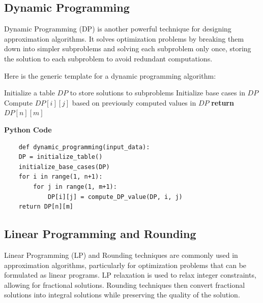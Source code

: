 \documentclass[12pt]{book} %
\begin{document}
\subsection{Dynamic Programming}

Dynamic Programming (DP) is another powerful technique for designing approximation algorithms. It solves optimization problems by breaking them down into simpler subproblems and solving each subproblem only once, storing the solution to each subproblem to avoid redundant computations.

Here is the generic template for a dynamic programming algorithm:
\FloatBarrier
\begin{algorithm}
\caption{Generic Dynamic Programming Algorithm}\label{alg:dp}
\begin{algorithmic}[1]
\State Initialize a table $DP$ to store solutions to subproblems
\State Initialize base cases in $DP$
        \State Compute $DP[i][j]$ based on previously computed values in $DP$
    \EndFor
\EndFor
\State \textbf{return} $DP[n][m]$
\EndProcedure
\end{algorithmic}
\end{algorithm}
\FloatBarrier
\textbf{Python Code}
\FloatBarrier
\begin{lstlisting}
    def dynamic_programming(input_data):
    DP = initialize_table()
    initialize_base_cases(DP)
    for i in range(1, n+1):
        for j in range(1, m+1):
            DP[i][j] = compute_DP_value(DP, i, j)
    return DP[n][m]
\end{lstlisting}

\subsection{Linear Programming and Rounding}

Linear Programming (LP) and Rounding techniques are commonly used in approximation algorithms, particularly for optimization problems that can be formulated as linear programs. LP relaxation is used to relax integer constraints, allowing for fractional solutions. Rounding techniques then convert fractional solutions into integral solutions while preserving the quality of the solution.
\end{document}
